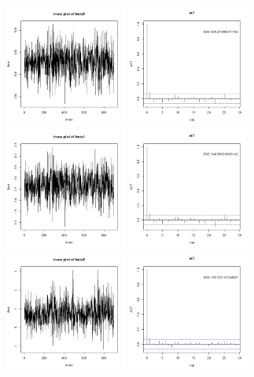 \documentclass{article}
\begin{document}
\begin{figure}[!h]
    \centering
    \includegraphics[width=4cm]{prob2_beta0_traceplot.png}
    \includegraphics[width=4cm]{prob2_beta0_acf.png}
    \includegraphics[width=4cm]{prob2_beta1_traceplot.png}
    \includegraphics[width=4cm]{prob2_beta1_acf.png} \\
    \includegraphics[width=4cm]{prob2_beta2_traceplot.png}
    \includegraphics[width=4cm]{prob2_beta2_acf.png}

\end{figure}
\end{document}

